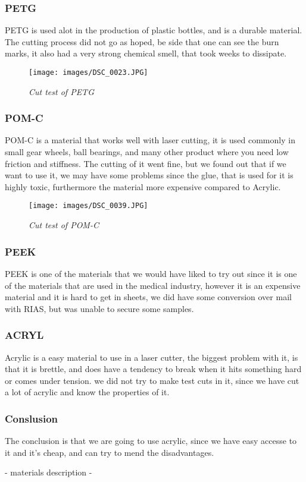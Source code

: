 \subsubsection{PETG}
PETG is used alot in the production of plastic bottles, and is a durable material.
The cutting process did not go as hoped, be side that one can see the burn marks, it also had a very strong chemical smell, that took weeks to dissipate.
\begin{figure}[!h]
	\centering
	\texttt{[image: images/DSC\_0023.JPG]}
	\caption{\small {\it {Cut test of PETG}}} \label{fig:explode}
\end{figure}
\FloatBarrier
\subsubsection{POM-C}
POM-C is a material that works well with laser cutting, it is used commonly in small gear wheels, ball bearings, and many other product where you need low friction and stiffness.
The cutting of it went fine, but we found out that if we want to use it, we may have some problems since the glue, that is used for it is highly toxic, furthermore the material more expensive compared to Acrylic.
\begin{figure}[!h]
	\centering
	\texttt{[image: images/DSC\_0039.JPG]}
	\caption{\small {\it {Cut test of POM-C}}} \label{fig:explode}
\end{figure}
\FloatBarrier

\subsubsection{PEEK}
PEEK is one of the materials that we would have liked to try out since it is one of the materials that are used in the medical industry, however it is an expensive material and it is hard to get in sheets, we did have some conversion over mail with RIAS, but was unable to secure some samples.

\subsubsection{ACRYL}
Acrylic is a easy material to use in a laser cutter, the biggest problem with it, is that it is brettle, and does have a tendency to break when it hits something hard or comes under tension.
we did not try to make test cuts in it, since we have cut a lot of acrylic and know the properties of it.

\subsubsection{Conslusion}
The conclusion is that we are going to use acrylic, since we have easy accesse to it and it's cheap, and can try to mend the disadvantages.

- materials description
- 